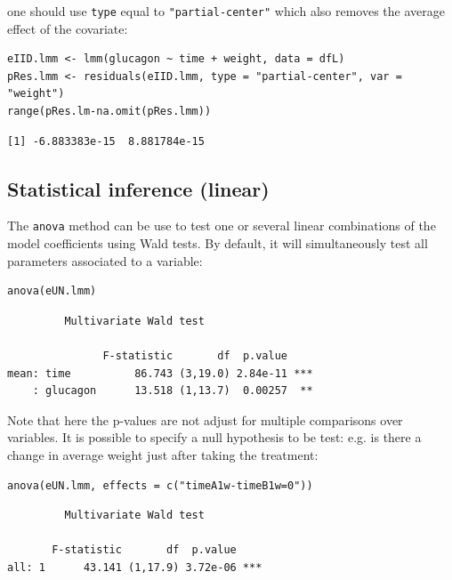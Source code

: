 \documentclass[12pt]{article}
\begin{document}
one should use \texttt{type} equal to \texttt{"partial-center"} which also removes
the average effect of the covariate:
\lstset{language=r,label= ,caption= ,captionpos=b,numbers=none}
\begin{lstlisting}
eIID.lmm <- lmm(glucagon ~ time + weight, data = dfL)
pRes.lmm <- residuals(eIID.lmm, type = "partial-center", var = "weight")
range(pRes.lm-na.omit(pRes.lmm))
\end{lstlisting}

\begin{verbatim}
[1] -6.883383e-15  8.881784e-15
\end{verbatim}


\clearpage

\subsection{Statistical inference (linear)}
\label{sec:org5f571e6}

The \texttt{anova} method can be use to test one or several linear
combinations of the model coefficients using Wald tests. By default,
it will simultaneously test all parameters associated to a variable:
\lstset{language=r,label= ,caption= ,captionpos=b,numbers=none}
\begin{lstlisting}
anova(eUN.lmm)
\end{lstlisting}

\begin{verbatim}
	     Multivariate Wald test 

               F-statistic       df  p.value    
mean: time          86.743 (3,19.0) 2.84e-11 ***
    : glucagon      13.518 (1,13.7)  0.00257  **
\end{verbatim}


Note that here the p-values are not adjust for multiple comparisons
over variables. It is possible to specify a null hypothesis to be
test: e.g. is there a change in average weight just after taking the
treatment:
\lstset{language=r,label= ,caption= ,captionpos=b,numbers=none}
\begin{lstlisting}
anova(eUN.lmm, effects = c("timeA1w-timeB1w=0"))
\end{lstlisting}

\begin{verbatim}
	     Multivariate Wald test 

       F-statistic       df  p.value    
all: 1      43.141 (1,17.9) 3.72e-06 ***
\end{verbatim}
\end{document}
